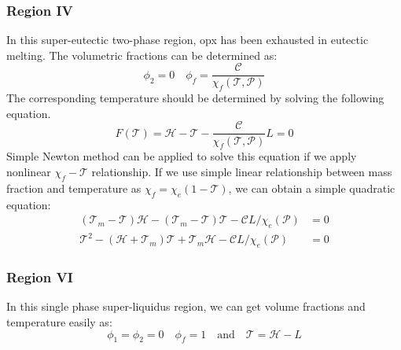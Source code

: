 \subsubsection{Region IV}
In this super-eutectic two-phase region, opx has been exhausted in eutectic melting.
The volumetric fractions can be determined as:
\begin{equation}
\phi_2 = 0 \quad \phi_f = \frac{\mathcal{C}}{\chi_f(\mathcal{T}, \mathcal{P})}
\end{equation}
The corresponding temperature should be determined by solving the following equation.
\begin{equation}
F(\mathcal{T}) = \mathcal{H} - \mathcal{T} - \frac{\mathcal{C}}{\chi_f(\mathcal{T}, \mathcal{P})} L = 0 
\end{equation}
Simple Newton method can be applied to solve this equation if we apply nonlinear $\chi_f-\mathcal{T}$ relationship.
If we use simple linear relationship between mass fraction and temperature as $\chi_f = \chi_e(1-\mathcal{T})$,
we can obtain a simple quadratic equation:
\begin{equation}
		  \begin{aligned}
					 (\mathcal{T}_m-\mathcal{T})\mathcal{H} - (\mathcal{T}_m-\mathcal{T})\mathcal{T} - \mathcal{C} L/\chi_e(\mathcal{P}) &= 0 \\
					 \mathcal{T}^2 - (\mathcal{H} + \mathcal{T}_m)\mathcal{T} + \mathcal{T}_m\mathcal{H} - \mathcal{C} L/\chi_e(\mathcal{P}) &= 0
		  \end{aligned}
\end{equation}

\subsubsection{Region VI}
In this single phase  super-liquidus region, we can get volume fractions and temperature easily as:
\begin{equation}
		  \phi_1 = \phi_2 = 0 \quad \phi_f = 1 \quad \text{and} \quad \mathcal{T} = \mathcal{H} - L
\end{equation}

